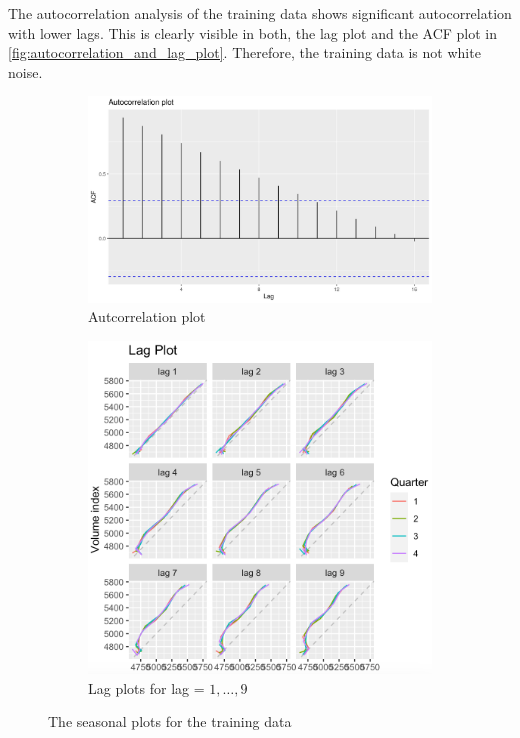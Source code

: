 \documentclass[10pt]{article}
\begin{document}
\clearpage
\noindent The autocorrelation analysis of the training data shows significant autocorrelation with lower lags. This is clearly visible in both, the lag plot and the ACF plot in \autoref{fig:autocorrelation_and_lag_plot}. Therefore, the training data is not white noise.
\begin{figure}[ht!]
\centering
\begin{subfigure}{.5\textwidth}
  \centering
  \includegraphics[width=1\linewidth]{img/autocorrelation.jpeg}
  \caption{Autcorrelation plot}
  \label{fig:autocorrelation}
\end{subfigure}%
\begin{subfigure}{.5\textwidth}
  \centering
  \includegraphics[width=1\linewidth]{img/lagplot.png}
  \caption{Lag plots for lag = $1, \dots, 9$}
  \label{fig:lag_plot}
\end{subfigure}
\caption{The seasonal plots for the training data}
\label{fig:autocorrelation_and_lag_plot}
\end{figure}
\end{document}
